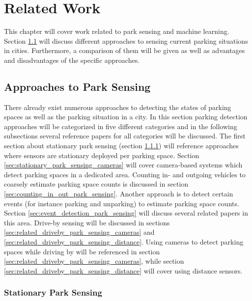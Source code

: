 \chapter{Related Work}
\label{chap:relatedwork}

This chapter will cover work related to park sensing and machine learning. Section \ref{sec:parksensing} will discuss different approaches to sensing current parking situations in cities. Furthermore, a comparison of them will be given as well as advantages and disadvantages of the specific approaches. 



\section{Approaches to Park Sensing}
\label{sec:parksensing}

There already exist numerous approaches to detecting the states of parking spaces as well as the parking situation in a city. In this section parking detection approaches will be categorized in five different categories and in the following subsections several reference papers for all categories will be discussed. The first section about stationary park sensing (section \ref{sec:stationary_park_sensing}) will reference approaches where sensors are stationary deployed per parking space. Section \ref{sec:stationary_park_sensing_cameras} will cover camera-based systems which detect parking spaces in a dedicated area. Counting in- and outgoing vehicles to coarsely estimate parking space counts is discussed in section \ref{sec:counting_in_out_park_sensing}. Another approach is to detect certain events (for instance parking and unparking) to estimate parking space counts. Section \ref{sec:event_detection_park_sensing} will discuss several related papers in this area. Drive-by sensing will be discussed in sections \ref{sec:related_driveby_park_sensing_cameras} and \ref{sec:related_driveby_park_sensing_distance}. Using cameras to detect parking spaces while driving by will be referenced in section \ref{sec:related_driveby_park_sensing_cameras}, while section \ref{sec:related_driveby_park_sensing_distance} will cover using distance sensors. 



\subsection{Stationary Park Sensing}
\label{sec:stationary_park_sensing}

